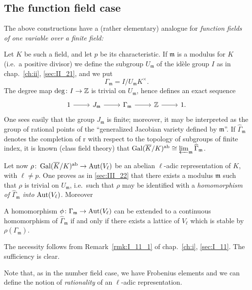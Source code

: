 \subsection{The function field case}
\label{sec:III_25}
The above constructions have a (rather elementary) analogue
for \emph{function fields of one variable over a finite field:}

Let $K$ be such a field, and let $p$ be its characteristic. If $\mathfrak{m}$
is a modulus for $K$ (i.e.\ a positive divisor) we define the subgroup
$U_{\mathfrak{m}}$ of the idèle group $I$ as in chap.~\ref{ch:ii},
\ref{sec:II_21}, and we put
\[
	\Gamma_{\mathfrak{m}} = I/U_{\mathfrak{m}} K^\times.
\]
\dpage
The degree map $\deg\colon I \to \mathbb{Z}$ is trivial on $U_{\mathfrak{m}}$, hence defines an
exact sequence
\[\begin{tikzcd}
	1 \rar & J_{\mathfrak{m}} \rar & \Gamma_{\mathfrak{m}} \rar & \Z \rar & 1.
\end{tikzcd}\]
One sees easily that the group $J_{\mathfrak{m}}$ is finite; moreover, it may
be interpreted as the group of rational points of the ``generalized Jacobian
variety defined by $\mathfrak{m}$''. If $\widehat{\Gamma}_{\mathfrak{m}}$
denotes the completion of r with respect to the topology of subgroups of finite
index, it is known (class field theory) that $\operatorname{Gal}(\overline{K}/K)^{\mathrm{ab}} \cong
\varprojlim_{\mathfrak{m}} \widehat{\Gamma}_{\mathfrak{m}}$.

Let now $\rho\colon \operatorname{Gal}(\overline{K}/K)^{\mathrm{ab}} \to \operatorname{Aut}(V_\ell)$ be an abelian
$\ell$-adic representation of $K$, with $\ell \ne p$. One proves as in
\ref{sec:III_22} that there exists a modulus $\mathfrak{m}$ such that $\rho$ is
trivial on $U_{\mathfrak{m}}$, i.e.\ such that $\rho$ may be identified with a
\emph{homomorphism of $\widehat{\Gamma}_{\mathfrak{m}}$ into $\operatorname{Aut}(V_\ell)$.}
Moreover

\begin{prop}
	A homomorphism $\phi\colon \Gamma_{\mathfrak{m}} \to \operatorname{Aut}(V_\ell)$
	can be extended to a continuous homomorphism of
	$\widehat{\Gamma}_{\mathfrak{m}}$ if and only if there exists a lattice
	of $V_\ell$ which is stable by $\rho(\Gamma_{\mathfrak{m}})$.
\end{prop}

The necessity follows from Remark~\ref{rmk:I_11_1} of chap.~\ref{ch:i},
\ref{sec:I_11}. The sufficiency is clear.

Note that, as in the number field case, we have Frobenius
elements and we can define the notion of \emph{rationality} of an $\ell$-adic
representation.

